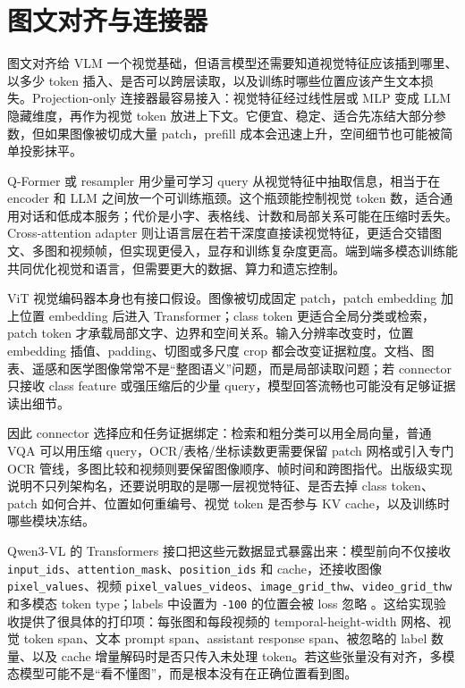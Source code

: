 \documentclass[UTF8,zihao=-4,openany]{ctexbook}
\begin{document}
\section{图文对齐与连接器}
图文对齐给 VLM 一个视觉基础，但语言模型还需要知道视觉特征应该插到哪里、以多少 token 插入、是否可以跨层读取，以及训练时哪些位置应该产生文本损失。Projection-only 连接器最容易接入：视觉特征经过线性层或 MLP 变成 LLM 隐藏维度，再作为视觉 token 放进上下文。它便宜、稳定、适合先冻结大部分参数，但如果图像被切成大量 patch，prefill 成本会迅速上升，空间细节也可能被简单投影抹平。

Q-Former 或 resampler 用少量可学习 query 从视觉特征中抽取信息，相当于在 encoder 和 LLM 之间放一个可训练瓶颈。这个瓶颈能控制视觉 token 数，适合通用对话和低成本服务；代价是小字、表格线、计数和局部关系可能在压缩时丢失。Cross-attention adapter 则让语言层在若干深度直接读视觉特征，更适合交错图文、多图和视频帧，但实现更侵入，显存和训练复杂度更高。端到端多模态训练能共同优化视觉和语言，但需要更大的数据、算力和遗忘控制。

ViT 视觉编码器本身也有接口假设。图像被切成固定 patch，patch embedding 加上位置 embedding 后进入 Transformer；class token 更适合全局分类或检索，patch token 才承载局部文字、边界和空间关系。输入分辨率改变时，位置 embedding 插值、padding、切图或多尺度 crop 都会改变证据粒度。文档、图表、遥感和医学图像常常不是“整图语义”问题，而是局部读取问题；若 connector 只接收 class feature 或强压缩后的少量 query，模型回答流畅也可能没有足够证据读出细节。

因此 connector 选择应和任务证据绑定：检索和粗分类可以用全局向量，普通 VQA 可以用压缩 query，OCR/表格/坐标读数更需要保留 patch 网格或引入专门 OCR 管线，多图比较和视频则要保留图像顺序、帧时间和跨图指代。出版级实现说明不只列架构名，还要说明取的是哪一层视觉特征、是否去掉 class token、patch 如何合并、位置如何重编号、视觉 token 是否参与 KV cache，以及训练时哪些模块冻结。

Qwen3-VL 的 Transformers 接口把这些元数据显式暴露出来：模型前向不仅接收 \texttt{input\_ids}、\texttt{attention\_mask}、\texttt{position\_ids} 和 cache，还接收图像 \texttt{pixel\_values}、视频 \texttt{pixel\_values\_videos}、\texttt{image\_grid\_thw}、\texttt{video\_grid\_thw} 和多模态 token type；labels 中设置为 \texttt{-100} 的位置会被 loss 忽略 \cite{huggingface2026transformersqwen3vl}。这给实现验收提供了很具体的打印项：每张图和每段视频的 temporal-height-width 网格、视觉 token span、文本 prompt span、assistant response span、被忽略的 label 数量、以及 cache 增量解码时是否只传入未处理 token。若这些张量没有对齐，多模态模型可能不是“看不懂图”，而是根本没有在正确位置看到图。
\end{document}
